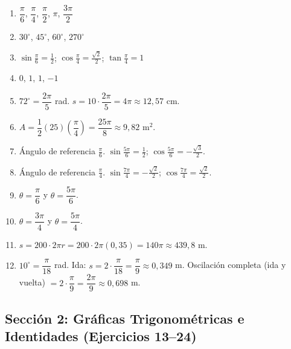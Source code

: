 \documentclass[12pt, letterpaper]{article}
\begin{document}
  \begin{enumerate}[series=respuestas, leftmargin=*, label=\textbf{\arabic*.}]
    \item $\dfrac{\pi}{6}$, $\dfrac{\pi}{4}$, $\dfrac{\pi}{2}$, $\pi$, $\dfrac{3\pi}{2}$
    \item $30^\circ$, $45^\circ$, $60^\circ$, $270^\circ$
    \item $\sin\frac{\pi}{6} = \frac{1}{2}$; $\cos\frac{\pi}{4} = \frac{\sqrt{2}}{2}$; $\tan\frac{\pi}{4} = 1$
    \item $0$, $1$, $1$, $-1$
    \item $72^\circ = \dfrac{2\pi}{5}$ rad. $s = 10 \cdot \dfrac{2\pi}{5} = 4\pi \approx 12{,}57$ cm.
    \item $A = \dfrac{1}{2}(25)\left(\dfrac{\pi}{4}\right) = \dfrac{25\pi}{8} \approx 9{,}82$ m$^2$.
    \item Ángulo de referencia $\frac{\pi}{6}$. $\sin\frac{5\pi}{6} = \frac{1}{2}$; $\cos\frac{5\pi}{6} = -\frac{\sqrt{3}}{2}$.
    \item Ángulo de referencia $\frac{\pi}{4}$. $\sin\frac{7\pi}{4} = -\frac{\sqrt{2}}{2}$; $\cos\frac{7\pi}{4} = \frac{\sqrt{2}}{2}$.
    \item $\theta = \dfrac{\pi}{6}$ y $\theta = \dfrac{5\pi}{6}$.
    \item $\theta = \dfrac{3\pi}{4}$ y $\theta = \dfrac{5\pi}{4}$.
    \item $s = 200 \cdot 2\pi r = 200 \cdot 2\pi (0{,}35) = 140\pi \approx 439{,}8$ m.
    \item $10^\circ = \dfrac{\pi}{18}$ rad. Ida: $s = 2 \cdot \dfrac{\pi}{18} = \dfrac{\pi}{9} \approx 0{,}349$ m. Oscilación completa (ida y vuelta) $= 2 \cdot \dfrac{\pi}{9} = \dfrac{2\pi}{9} \approx 0{,}698$ m.
  \end{enumerate}


  \subsection*{Sección 2: Gráficas Trigonométricas e Identidades (Ejercicios 13--24)}
\end{document}
